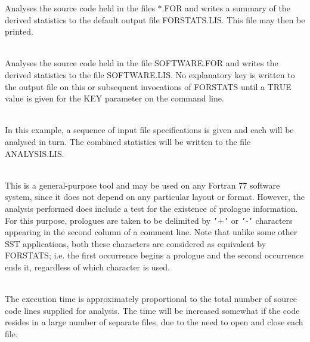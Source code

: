 \documentclass[twoside,11pt]{article}
\renewcommand{\_}{\texttt{\symbol{95}}}
\newlength{\sstexampleslength}
\newcommand{\sstexamplesubsection}[2]{\sloppy
\item[\parbox{\sstexampleslength}{\ssttt #1}] \mbox{} \vspace{1.0ex}
\\ #2 }
\newcommand{\sstnotes}[1]{\item[Notes:] \mbox{} \\[1.3ex] #1}
\newcommand{\sstdiytopic}[2]{\item[{\hspace{-0.35em}#1\hspace{-0.35em}:}]
\mbox{} \\[1.3ex] #2}
\newcommand{\sstexamplesubsection}[2]{\item[{\ssttt #1}] #2}
\newcommand{\sstnotes}[1]{\item[Notes:] #1 }
\newcommand{\sstdiytopic}[2]{\item[{#1}] #2 }
\begin{document}
{{{      }{
         Analyses the source code held in the files $*$.FOR and writes a
         summary of the derived statistics to the default output file
         FORSTATS.LIS. This file may then be printed.
      }
      \sstexamplesubsection{
         FORSTATS SOFTWARE.FOR SOFTWARE.LIS NOKEY
      }{
         Analyses the source code held in the file SOFTWARE.FOR and
         writes the derived statistics to the file SOFTWARE.LIS. No
         explanatory key is written to the output file on this or
         subsequent invocations of FORSTATS until a TRUE value is given
         for the KEY parameter on the command line.
      }
      \sstexamplesubsection{
         FORSTATS IN=[{\tt "}A$*$.FOR{\tt "},{\tt "}B$*$.FOR{\tt "}] OUT=ANALYSIS.LIS
      }{
         In this example, a sequence of input file specifications is
         given and each will be analysed in turn. The combined
         statistics will be written to the file ANALYSIS.LIS.
      }
   }
   \sstnotes{
      This is a general-purpose tool and may be used on any Fortran 77
      software system, since it does not depend on any particular
      layout or format. However, the analysis performed does include a
      test for the existence of prologue information. For this purpose,
      prologues are taken to be delimited by {\tt '}$+${\tt '} or {\tt '}-{\tt '} characters
      appearing in the second column of a comment line. Note that
      unlike some other SST applications, both these characters are
      considered as equivalent by FORSTATS; i.e. the first occurrence
      begins a prologue and the second occurrence ends it, regardless
      of which character is used.
   }
   \sstdiytopic{
      Timing
   }{
      The execution time is approximately proportional to the total
      number of source code lines supplied for analysis. The time will
      be increased somewhat if the code resides in a large number of
      separate files, due to the need to open and close each file.
   }
}
\newpage
\end{document}
